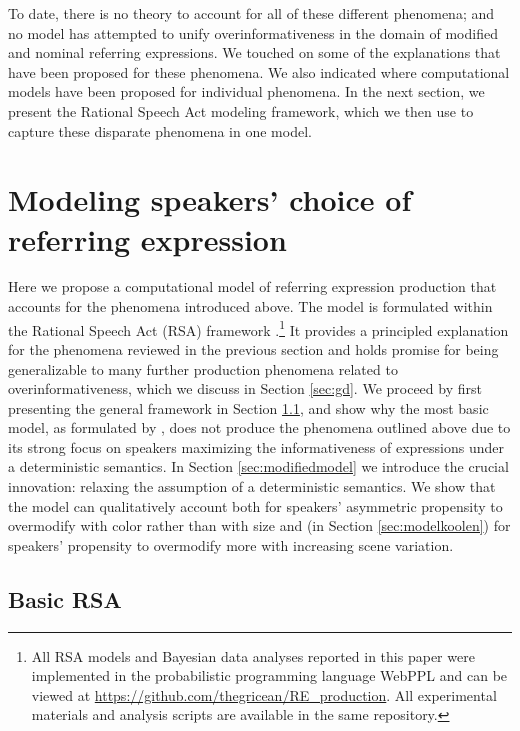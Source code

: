 \documentclass[11pt]{article}
\newcommand{\sectionref}[1]{Section \ref{#1}}
\begin{document}
To date, there is no theory to account for all of these different phenomena; and no model has attempted to unify overinformativeness in the domain of modified and nominal referring expressions. We touched on some of the explanations that have been proposed for these phenomena. We also indicated where computational models have been proposed for individual phenomena. In the next section, we present the Rational Speech Act modeling framework, which we then use to capture these disparate phenomena in one model.


\section[]{Modeling speakers' choice of referring expression}
\label{sec:models}

Here we propose a computational model of referring expression production that accounts for the phenomena introduced above. The model is formulated within the Rational Speech Act (RSA) framework \cite{frank2012, goodman2016}.\footnote{All RSA models and Bayesian data analyses reported in this paper were implemented in the probabilistic programming language WebPPL \cite{GoodmanStuhlmuller14_DIPPL} and can be viewed at \url{https://github.com/thegricean/RE_production}. All experimental materials and analysis scripts are available in the same repository.} It provides a principled explanation for the phenomena reviewed in the previous section and  holds promise for being generalizable to many further production phenomena related to overinformativeness, which we discuss in \sectionref{sec:gd}. We proceed by first presenting the general framework in \sectionref{sec:basicrsa}, and show why the most basic model, as formulated by , does not produce the phenomena outlined above due to its strong focus on speakers maximizing the informativeness of expressions under a deterministic semantics. In \sectionref{sec:modifiedmodel} we introduce the crucial innovation: relaxing the assumption of a deterministic semantics. We show that the model can qualitatively account both for speakers' asymmetric propensity to overmodify with color rather than with size and (in \sectionref{sec:modelkoolen}) for speakers' propensity to overmodify more with increasing scene variation. 

\subsection{Basic RSA}
\label{sec:basicrsa}
\end{document}
